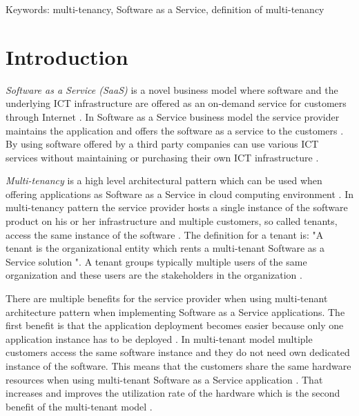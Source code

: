 \documentclass[conference]{sasmoota2017}
\begin{document}

Keywords: multi-tenancy, Software as a Service, definition of multi-tenancy



\IEEEpeerreviewmaketitle



\section{Introduction}

\textit{Software as a Service (SaaS)} is a novel business model where software and the underlying ICT infrastructure are offered as an on-demand service for customers through Internet \cite{Bezemer:2010:MaintenanceDream}. In Software as a Service business model the service provider maintains the application and offers the software as a service to the customers \cite{Bezemer:2010:MaintenanceDream}. By using software offered by a third party companies can use various ICT services without maintaining or purchasing their own ICT infrastructure \cite{Bezemer:2010:MaintenanceDream}. 

\textit{Multi-tenancy} is a high level architectural pattern which can be used when offering applications as Software as a Service in cloud computing environment \cite{Kabbedijk2015:Defining}. In multi-tenancy pattern the service provider hosts a single instance of the software product on his or her infrastructure and multiple customers, so called tenants, access the same instance of the software \cite{Bezemer:2010:MaintenanceDream}. The definition for a tenant is: "A tenant is the organizational entity which rents a multi-tenant Software as a Service solution \cite{Bezemer:2010:MaintenanceDream}". A tenant groups typically multiple users of the same organization and these users are the stakeholders in the organization \cite{Bezemer:2010:MaintenanceDream}. 

There are multiple benefits for the service provider when using multi-tenant architecture pattern when implementing Software as a Service applications. The first benefit is that the application deployment becomes easier because only one application instance has to be deployed \cite{Bezemer:2010:MaintenanceDream}. In multi-tenant model multiple customers access the same software instance and they do not need own dedicated instance of the software. This means that the customers share the same hardware resources when using multi-tenant Software as a Service application \cite{Guo:2007:FrameworkForNative}. That increases and improves the utilization rate of the hardware which is the second benefit of the multi-tenant model \cite{Bezemer:2010:MaintenanceDream}. 
\end{document}
